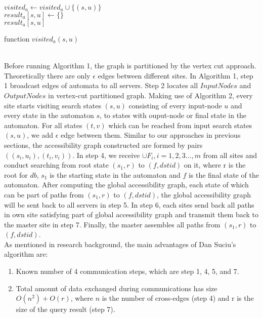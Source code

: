 \begin{algorithm}
    $visited_a\leftarrow visited_a\cup \{(s,u)\}$\\
    $result_a[s,u]\leftarrow\{\}$\\
    \Return $result_a[s,u]$
    \caption{function $visited_a(s,u)$}
\end{algorithm}
\\Before running Algorithm 1, the graph is partitioned by the vertex cut approach. Theoretically there are only $\epsilon$ edges between different sites. In Algorithm 1,  step 1 broadcast edges of automata to all servers. Step 2 locates all $InputNodes$ and $OutputNodes$ in vertex-cut partitioned graph. Making use of Algorithm 2, every site starts visiting search states $(s,u)$ consisting of every input-node $u$ and every state in the automaton $s$, to states with ouput-node or final state in the automaton. For all states $(t,v)$ which can be reached from input search states $(s,u)$, we add $\epsilon$ edge between them. Similar to our approaches in previous sections, the accessibility graph constructed are formed by pairs $((s_i,u_i),(t_i,v_i))$. In step 4, we receive $\cup F_i,i=1,2,3...,m$ from all sites and conduct searching from root state $(s_1,r)$ to $(f,dstid)$ on it, where r is the root for $db$, $s_1$ is the starting state in the automaton and $f$ is the final state of the automaton. After computing the global accessibility graph, each state of which can be part of paths from $(s_1,r)$ to $(f,dstid)$, the global accessibility graph will be sent back to all servers in step 5. In step 6, each sites send back all paths in own site satisfying part of global accessibility graph and transmit them back to the master site in step 7. Finally, the master assembles all paths from $(s_1,r)$ to $(f,dstid)$.\\
As mentioned in research background, the main advantages of Dan Suciu's algorithm are:
\begin{enumerate}
    \item Known number of 4 communication steps, which are step 1, 4, 5, and 7.
    \item Total amount of data exchanged during communications has size $O(n^2)+O(r)$, where $n$ is the number of cross-edges (step 4) and r is the size of the query result (step 7).
\end{enumerate}
